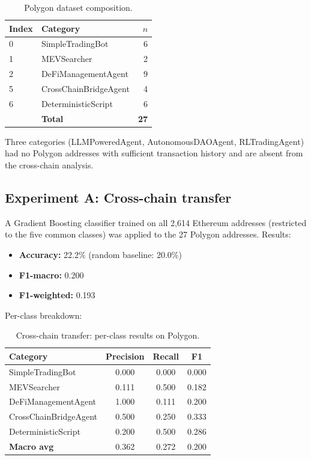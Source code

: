 \documentclass[11pt,a4paper]{article}
\renewcommand{\_}{\oldunderscore\allowbreak}
\begin{document}
\begin{table}[h]
\centering
\caption{Polygon dataset composition.}
\label{tab:polygon_data}
\begin{tabular}{llr}
\toprule
\textbf{Index} & \textbf{Category} & \textbf{$n$} \\
\midrule
0 & SimpleTradingBot      & 6 \\
1 & MEVSearcher           & 2 \\
2 & DeFiManagementAgent   & 9 \\
5 & CrossChainBridgeAgent & 4 \\
6 & DeterministicScript   & 6 \\
\midrule
  & \textbf{Total}        & \textbf{27} \\
\bottomrule
\end{tabular}
\end{table}

Three categories (LLMPoweredAgent, AutonomousDAOAgent, RLTradingAgent)
had no Polygon addresses with sufficient transaction history and are
absent from the cross-chain analysis.

\subsection{Experiment A: Cross-chain transfer}

A Gradient Boosting classifier trained on all 2{,}614 Ethereum
addresses (restricted to the five common classes) was applied to the
27 Polygon addresses. Results:

\begin{itemize}
  \item \textbf{Accuracy:} 22.2\% (random baseline: 20.0\%)
  \item \textbf{F1-macro:} 0.200
  \item \textbf{F1-weighted:} 0.193
\end{itemize}

Per-class breakdown:

\begin{table}[h]
\centering
\caption{Cross-chain transfer: per-class results on Polygon.}
\label{tab:polygon_transfer}
\begin{tabular}{lccc}
\toprule
\textbf{Category} & \textbf{Precision} & \textbf{Recall} & \textbf{F1} \\
\midrule
SimpleTradingBot      & 0.000 & 0.000 & 0.000 \\
MEVSearcher           & 0.111 & 0.500 & 0.182 \\
DeFiManagementAgent   & 1.000 & 0.111 & 0.200 \\
CrossChainBridgeAgent & 0.500 & 0.250 & 0.333 \\
DeterministicScript   & 0.200 & 0.500 & 0.286 \\
\midrule
\textbf{Macro avg}    & 0.362 & 0.272 & 0.200 \\
\bottomrule
\end{tabular}
\end{table}
\end{document}
